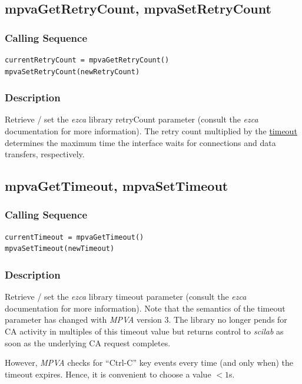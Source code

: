 \documentclass{article}
\newcommand{\sca}{\ita{MPVA}}
\newcommand{\scilab}{\ita{scilab}}
\newcommand{\ezca}{\ita{ezca}}
\newcommand{\pbrk}{\pagebreak[3]}
\newcommand{\ita}[1]{\emph{#1}}
\renewcommand{\pbrk}{}
\begin{document}
\vspace*{\fill}
\pbrk
\subsection{mpvaGetRetryCount, mpvaSetRetryCount}
\label{retrycnt}
\subsubsection{Calling Sequence}
\begin{verbatim}
currentRetryCount = mpvaGetRetryCount()
mpvaSetRetryCount(newRetryCount)
\end{verbatim}
\subsubsection{Description}
Retrieve / set the \ezca{} library retryCount parameter (consult the \ezca{}
documentation for more information). The retry count multiplied by the
\hyperref{timeout parameter}{timeout parameter (see }{ )}{timeout}
determines the maximum time the interface waits for connections and data
transfers, respectively.

\vspace*{\fill}
\pbrk
\subsection{mpvaGetTimeout, mpvaSetTimeout}
\label{timeout}
\subsubsection{Calling Sequence}
\begin{verbatim}
currentTimeout = mpvaGetTimeout()
mpvaSetTimeout(newTimeout)
\end{verbatim}
\subsubsection{Description}
Retrieve / set the \ezca{} library timeout parameter (consult the \ezca{}
documentation for more information). Note that the semantics of the
timeout parameter has changed with \sca{} version 3. The library no longer
pends for CA activity in multiples of this timeout value but returns
control to \scilab{} as soon as the underlying CA request completes.

However, \sca{} checks for ``Ctrl-C'' key events every time
(and only when) the timeout expires. Hence, it is convenient to
choose a value $<1$s.
\end{document}

